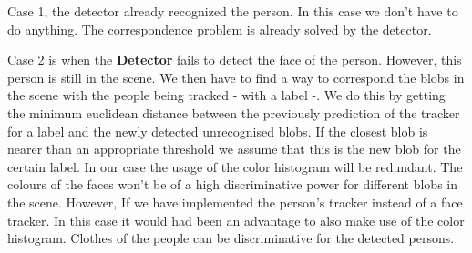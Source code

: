 Case 1, the detector already recognized the person. In this case we don't have to do anything. The correspondence problem is already solved by the detector.

Case 2 is when the \textbf{Detector} fails to detect the face of the person. However, this person is still in the scene. We then have to find a way to correspond the blobs in the scene with the people being tracked - with a label -. We do this by getting the minimum euclidean distance between the previously prediction of the tracker for a label and the newly detected unrecognised blobs. If the closest blob is nearer than an appropriate threshold we assume that this is the new blob for the certain label. In our case the usage of the color histogram will be redundant. The colours of the faces won't be of a high discriminative power for different blobs in the scene. However, If we have implemented the person's tracker instead of a face tracker. In this case it would had been an advantage to also make use of the color histogram. Clothes of the people can be discriminative for the detected persons.
